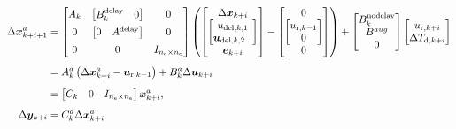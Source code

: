 \begin{equation}
  \begin{split}
    \Delta \bm{x}_{k+i+1}^a     & =
    \begin{bmatrix}
      A_k & \begin{bmatrix}B_k^\text{delay} & 0\end{bmatrix} & 0 \\[0.5em]
      0 & \begin{bmatrix} 0 & A^\text{delay} \end{bmatrix} & 0\\[0.5em]
      0 & 0 & I_{n_\text{e}\times n_\text{e}}
    \end{bmatrix}
    \left(\begin{bmatrix}
      \Delta \bm{x}_{k+i}\\
      \begin{bmatrix}
        u_{\text{del},k,1}\\
        \bm{u}_{\text{del},k,2\ldots}\\
      \end{bmatrix}\\
      \bm{e}_{k+i}
    \end{bmatrix} -
    \begin{bmatrix}
      0\\
      \begin{bmatrix}
        u_{\text{r},k-1}\\
        0\\
      \end{bmatrix}\\
      0
    \end{bmatrix}
    \right) + 
    \begin{bmatrix}
      B_k^\text{nodelay}\\
      B^{aug}\\
      0
    \end{bmatrix}
    \begin{bmatrix}
      u_{\text{r},k+i}\\
      \Delta T_{\text{d},k+i}
    \end{bmatrix}\\[0.5em]
    & = A_k^a \left(\Delta \bm{x}_{k+i}^a - \bm{u}_{\text{r},k-1}\right) + B_k^a \Delta \bm{u}_{k+i}\\[0.5em]
    & = \begin{bmatrix}
      C_k & 0 & I_{n_\text{e} \times n_\text{e}}
    \end{bmatrix}
    \bm{x}_{k+i}^a,\\[0.5em]
    \Delta \bm{y}_{k+i} & = C_k^a \Delta \bm{x}_{k+i}^a\\[0.5em]
  \end{split}
  \label{eq:mpc:augmented-state-eqs}
\end{equation}

